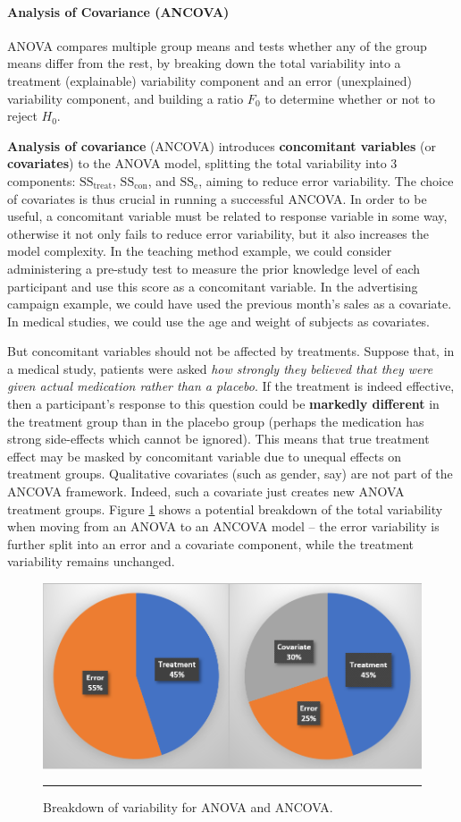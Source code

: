 \paragraph{Analysis of Covariance (ANCOVA)}
ANOVA compares multiple group means and tests whether any of the group means differ from the rest, by breaking down the total variability into a treatment (explainable) variability component and an error (unexplained) variability component, and building a ratio $F_0$ to determine whether or not to reject $H_{0}$. \par \textbf{Analysis of covariance} (ANCOVA) introduces \textbf{concomitant variables} (or \textbf{covariates}) to the ANOVA model, splitting the total variability into 3 components: $\text{SS}_{\textrm{treat}}$, $\text{SS}_{\textrm{con}}$, and $\text{SS}_{\textrm{e}}$, aiming to reduce error variability. The choice of covariates is thus crucial in running a successful ANCOVA.
\newl In order to be useful, a concomitant variable must be related to response variable in some way, otherwise it not only fails to reduce error variability, but it also increases the model complexity. In the teaching method example, we could consider administering a pre-study test to measure the prior knowledge level of each participant and use this score as a concomitant variable. In the advertising campaign example, we could have used the previous month's sales as a covariate. In medical studies, we could use the age and weight of subjects as covariates.
\par But concomitant variables should not be affected by treatments. Suppose that, in a medical study, patients were asked \textit{how strongly they believed that they were given actual medication rather than a placebo}. If the treatment is indeed effective, then a participant's response to this question could be \textbf{markedly different} in the treatment group than in the  placebo group (perhaps the medication has strong side-effects which cannot be ignored). This means that true treatment effect may be masked by concomitant variable due to unequal effects on treatment groups.
\newl Qualitative covariates (such as gender, say) are not part of the ANCOVA framework. Indeed, such a covariate just creates new ANOVA treatment groups. \newl Figure \ref{fig:testA14} shows a potential breakdown of the total variability when moving from an ANOVA to an ANCOVA model -- the error variability is further split into an error and a covariate component, while the treatment variability remains unchanged.
\begin{figure}[!t]
\centering
  \includegraphics[width=0.6\linewidth]{images/SA/testA14.png}
  \caption[\small Breakdown of variability for ANOVA and ANCOVA]{\small Breakdown of variability for ANOVA and ANCOVA.}
  \label{fig:testA14}\hrule
\end{figure}
\afterpage{\FloatBarrier}
